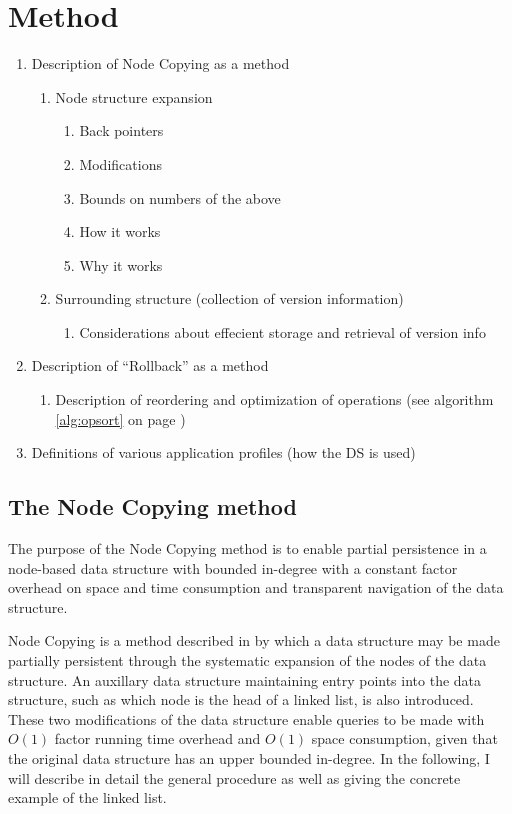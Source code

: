 \chapter{Method}

\begin{enumerate}   \item Description of Node Copying as a method
  \begin{enumerate}     \item Node structure expansion
    \begin{enumerate}       \item Back pointers
      \item Modifications \item Bounds on numbers of the above \item How it
      works \item Why it works     \end{enumerate}
    \item Surrounding structure (collection of version information)
    \begin{enumerate}       \item Considerations about effecient storage and
    retrieval of version info     \end{enumerate}
  \end{enumerate}
  \item Description of ``Rollback'' as a method \begin{enumerate}     \item
  Description of reordering and optimization of operations (see algorithm
  \ref{alg:opsort} on page \pageref{alg:opsort})
  \end{enumerate}
  \item Definitions of various application profiles (how the DS is used)
  \end{enumerate}

\section{The Node Copying method}
The purpose of the Node Copying method is to enable partial persistence in a
node-based data structure with bounded in-degree with a constant factor overhead
on space and time consumption and transparent navigation of the data structure.

Node Copying is a method described in \cite{Driscoll198986} by which a data
structure may be made partially persistent through the systematic expansion of
the nodes of the data structure. An auxillary data structure maintaining entry
points into the data structure, such as which node is the head of a linked list,
is also introduced. These two modifications of the data structure enable queries
to be made with $O(1)$ factor running time overhead and $O(1)$ space
consumption, given that the original data structure has an upper bounded
in-degree. In the following, I will describe in detail the general procedure as
well as giving the concrete example of the linked list.

